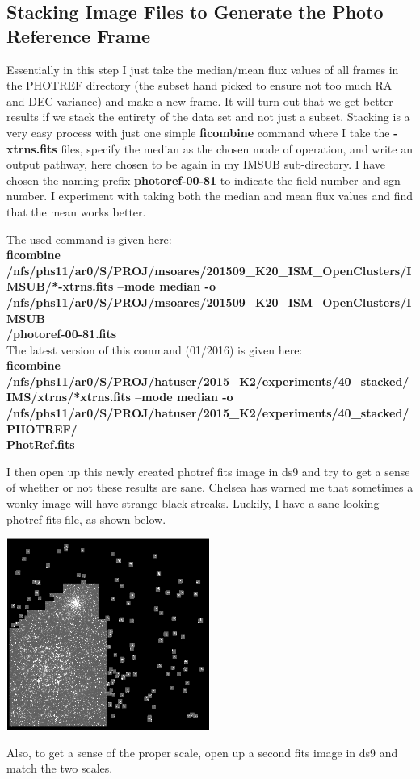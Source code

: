 \documentclass[11pt,letterpaper]{book} %
\begin{document}
\subsection*{Stacking Image Files to Generate the Photo Reference Frame}
Essentially in this step I just take the median/mean flux values of all frames in the PHOTREF directory (the subset hand picked to ensure not too much RA and DEC variance) and make a new frame. It will turn out that we get better results if we stack the entirety of the data set and not just a subset. Stacking is a very easy process with just one simple \textbf{ficombine} command where I take the \textbf{-xtrns.fits} files, specify the median as the chosen mode of operation, and write an output pathway, here chosen to be again in my IMSUB sub-directory. I have chosen the naming prefix \textbf{photoref-00-81} to indicate the field number and sgn number. I experiment with taking both the median and mean flux values and find that the mean works better. 

The used command is given here:\\
\textbf{ficombine /nfs/phs11/ar0/S/PROJ/msoares/201509\_K20\_ISM\_OpenClusters/IMSUB/*-xtrns.fits --mode median -o /nfs/phs11/ar0/S/PROJ/msoares/201509\_K20\_ISM\_OpenClusters/IMSUB \\ /photoref-00-81.fits}\\
The latest version of this command (01/2016) is given here: \\
\textbf{ficombine /nfs/phs11/ar0/S/PROJ/hatuser/2015\_K2/experiments/40\_stacked/IMS/xtrns/*xtrns.fits --mode median -o /nfs/phs11/ar0/S/PROJ/hatuser/2015\_K2/experiments/40\_stacked/PHOTREF/ \\ PhotRef.fits}

I then open up this newly created photref fits image in ds9 and try to get a sense of whether or not these results are sane. Chelsea has warned me that sometimes a wonky image will have strange black streaks. Luckily, I have a sane looking photref fits file, as shown below.
\begin{center}
\includegraphics[width=0.5\textwidth]{median.png}
\end{center}
Also, to get a sense of the proper scale, open up a second fits image in ds9 and match the two scales. 
\end{document}
